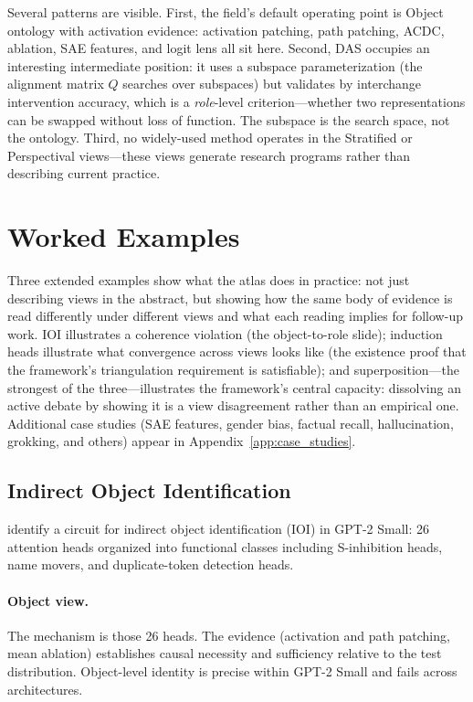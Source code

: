\documentclass{article}
\begin{document}
Several patterns are visible.  First, the field's default operating point
is Object ontology with activation evidence: activation patching, path
patching, ACDC, ablation, SAE features, and logit lens all sit here.
Second, DAS occupies an interesting intermediate position: it uses a
subspace parameterization (the alignment matrix $Q$ searches over
subspaces) but validates by interchange intervention accuracy, which is a
\emph{role}-level criterion---whether two representations can be swapped
without loss of function.  The subspace is the search space, not the
ontology.  Third, no widely-used method operates in the Stratified or
Perspectival views---these views generate research programs rather than
describing current practice.

\section{Worked Examples}\label{sec:examples}

Three extended examples show what the atlas does in practice: not just
describing views in the abstract, but showing how the same body of
evidence is read differently under different views and what each reading
implies for follow-up work.  IOI illustrates a coherence violation
(the object-to-role slide); induction heads illustrate what convergence
across views looks like (the existence proof that the framework's
triangulation requirement is satisfiable); and superposition---the
strongest of the three---illustrates the framework's central capacity:
dissolving an active debate by showing it is a view disagreement rather
than an empirical one.
Additional case studies (SAE features, gender bias, factual recall,
hallucination, grokking, and others) appear in
Appendix~\ref{app:case_studies}.

\subsection{Indirect Object Identification}

\citet{wang2022} identify a circuit for indirect object identification
(IOI) in GPT-2 Small: 26 attention heads organized into functional
classes including S-inhibition heads, name movers, and
duplicate-token detection heads.

\paragraph{Object view.}
The mechanism is those 26 heads.  The evidence (activation and path
patching, mean ablation) establishes causal necessity and sufficiency
relative to the test distribution.  Object-level identity is precise
within GPT-2 Small and fails across architectures.
\end{document}

